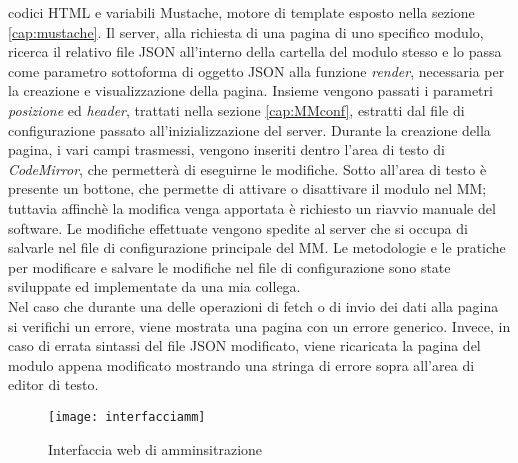 codici HTML e variabili Mustache, motore di template esposto nella sezione \ref{cap:mustache}.
Il server, alla richiesta di una pagina di uno specifico modulo, ricerca il relativo file JSON all'interno della cartella del modulo stesso e lo
passa come parametro sottoforma di oggetto JSON alla funzione \textit{render}, necessaria per la creazione e visualizzazione della pagina.
Insieme vengono passati i parametri \textit{posizione} ed \textit{header}, trattati nella sezione \ref{cap:MMconf}, estratti dal file
di configurazione passato all'inizializzazione del server.
Durante la creazione della pagina, i vari campi trasmessi, vengono inseriti dentro l'area di testo di \textit{CodeMirror}, che permetter\`a di eseguirne
le modifiche. Sotto all'area di testo \`e presente un bottone, che permette di attivare o disattivare il modulo nel MM; tuttavia affinch\`e la modifica
venga apportata \`e richiesto un riavvio manuale del software.
Le modifiche effettuate vengono spedite al server che si occupa di salvarle nel file di configurazione
principale del MM. Le metodologie e le pratiche per modificare e salvare le modifiche nel file di configurazione sono state sviluppate ed
implementate da una mia collega.\\
Nel caso che durante una delle operazioni di fetch o di invio dei dati alla pagina si verifichi un errore, viene mostrata una pagina
con un errore generico. Invece, in caso di errata sintassi del file JSON modificato, viene ricaricata la pagina del modulo appena modificato
mostrando una stringa di errore sopra all'area di editor di testo.


\begin{figure}[H]
    \texttt{[image: interfacciamm]}
    \caption{Interfaccia web di amminsitrazione}
    \label{fig:interfaccia}
\end{figure}
